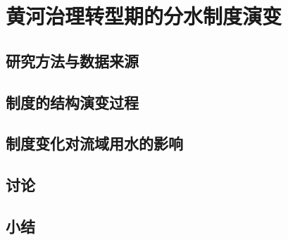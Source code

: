 \chapter{黄河治理转型期的分水制度演变}\label{cha:5}


\section{研究方法与数据来源}\label{ch5:methods}


\section{制度的结构演变过程}\label{ch5:process}


\section{制度变化对流域用水的影响}\label{ch5:mechanism}


\section{讨论}\label{ch5:discussion}


\section{小结}\label{ch5:summary}
% 
